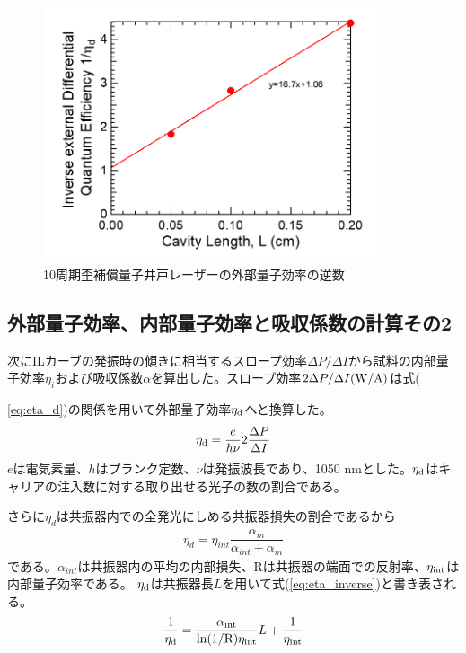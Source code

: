 {\begin{figure}[h]
	\centering
	\includegraphics[width=10cm]{figure/fig_3_1_10QW_broadcontact_id_inverse.png}
	\caption{10周期歪補償量子井戸レーザーの外部量子効率の逆数}
	\label{fig:fig_3_1_10QW_broadcontact_id_inverse}
\end{figure}
\clearpage
\subsection{外部量子効率、内部量子効率と吸収係数の計算その2}%
次にILカーブの発振時の傾きに相当するスロープ効率$\Delta P/\Delta I$から試料の内部量子効率$\eta_{i}$および吸収係数$\alpha$を算出した。スロープ効率$2 \Delta P/\Delta I \rm{ (W/A)}$は式({\ref{eq:eta_d})の関係を用いて外部量子効率$\eta_{\rm{d}}$へと換算した。
\begin{eqnarray}
\eta_{\rm{d}}=\dfrac{e}{h\nu}2\dfrac{\Delta P}{\Delta I} 
\label{eq:eta_d}
\end{eqnarray}
$e$は電気素量、$h$はプランク定数、$\nu$は発振波長であり、1050 nmとした。$\eta_{\rm{d}}$はキャリアの注入数に対する取り出せる光子の数の割合である。


さらに$\eta_{d}$は共振器内での全発光にしめる共振器損失の割合であるから
\begin{eqnarray}
\eta_{d}=\eta_{int}\dfrac{\alpha_{m}}{\alpha_{int} +\alpha_{m}}
\end{eqnarray}
である。$\alpha_{int}$は共振器内の平均の内部損失、Rは共振器の端面での反射率、$\eta_{\rm{int}}$は内部量子効率である。
$\eta_{\rm{d}}$は共振器長$L$を用いて式(\ref{eq:eta_inverse})と書き表される。
\begin{eqnarray}
\dfrac{1}{\eta_{\rm{d}}}=\dfrac{\alpha_{\rm{int}}}{\rm{ln}(1/R)\eta_{int}}L+\dfrac{1}{\eta_{\rm{int}}}
\label{eq:eta_inverse}
\end{eqnarray}



}}
